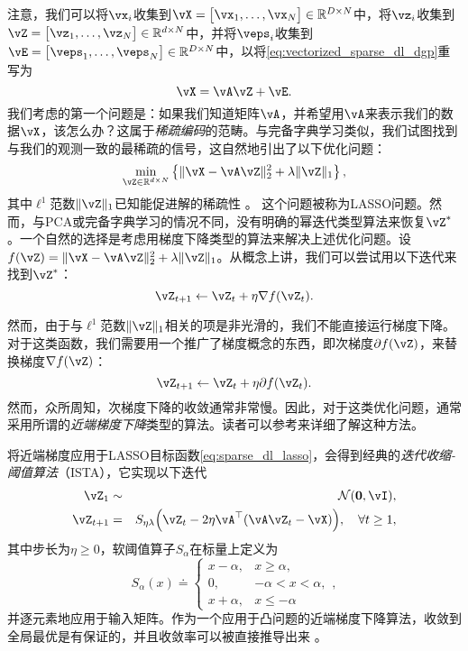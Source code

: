 \documentclass[../../book-main_zh.tex]{subfiles}
\begin{document}
注意，我们可以将\(\vx_{i}\)收集到\(\vX = \mat{\vx_{1}, \dots, \vx_{N}} \in \R^{D \times N}\)中，将\(\vz_{i}\)收集到\(\vZ = \mat{\vz_{1}, \dots, \vz_{N}} \in \R^{d  \times N}\)中，并将\(\veps_{i}\)收集到\(\vE = \mat{\veps_{1}, \dots, \veps_{N}} \in \R^{D \times N}\)中，以将\eqref{eq:vectorized_sparse_dl_dgp}重写为
\begin{equation}\label{eq:sparse_dl_dgp}
    \vX = \vA\vZ + \vE.
\end{equation}
我们考虑的第一个问题是：如果我们知道矩阵\(\vA\)，并希望用\(\vA\)来表示我们的数据\(\vX\)，该怎么办？这属于\textit{稀疏编码}的范畴。与完备字典学习类似，我们试图找到与我们的观测一致的最稀疏的信号，这自然地引出了以下优化问题：
\begin{equation}\label{eq:sparse_dl_lasso}
    \min_{\vZ \in \R^{d \times N}}\bc{\norm{\vX - \vA\vZ}_{2}^{2} + \lambda \norm{\vZ}_{1}},
\end{equation}
其中\(\ell^1\)范数\(\norm{\vZ}_{1}\)已知能促进解的稀疏性 \cite{Wright-Ma-2022}。
这个问题被称为LASSO问题。然而，与PCA或完备字典学习的情况不同，没有明确的幂迭代类型算法来恢复\(\vZ^{\ast}\)。一个自然的选择是考虑用梯度下降类型的算法来解决上述优化问题。设\(f(\vZ) = \norm{\vX - \vA\vZ}_{2}^{2} + \lambda \norm{\vZ}_{1}\)。从概念上讲，我们可以尝试用以下迭代来找到\(\vZ^{\ast}\)：
\begin{equation}
    \vZ_{t+1} \leftarrow \vZ_t + \eta \nabla f(\vZ_t).
\end{equation}

然而，由于与\(\ell^1\)范数\(\norm{\vZ}_{1}\)相关的项是非光滑的，我们不能直接运行梯度下降。对于这类函数，我们需要用一个推广了梯度概念的东西，即次梯度\(\partial f(\vZ)\)，来替换梯度\(\nabla f(\vZ)\)：
\begin{equation}
    \vZ_{t+1} \leftarrow \vZ_t + \eta \partial f(\vZ_t).
\end{equation}
然而，众所周知，次梯度下降的收敛通常非常慢。因此，对于这类优化问题，通常采用所谓的\textit{近端梯度下降}类型的算法。读者可以参考\cite{Wright-Ma-2022}来详细了解这种方法。

将近端梯度应用于LASSO目标函数\eqref{eq:sparse_dl_lasso}，会得到经典的\textit{迭代收缩-阈值算法}（ISTA），它实现以下迭代
\begin{eqnarray}
    \vZ_{1} &\sim& \dNorm(\vzero, \vI), \\
    \vZ_{t + 1} &=& S_{\eta\lambda}\rp{\vZ_{t} - 2\eta \vA^{\top}(\vA\vZ_{t} - \vX)}, \quad \forall t \geq 1,\label{eq:ista_update}
\end{eqnarray}
其中步长为\(\eta \geq 0\)，软阈值算子\(S_{\alpha}\)在标量上定义为
\begin{equation}
    S_{\alpha}(x) \doteq \begin{cases}x - \alpha, & x \geq \alpha, \\ 0, & -\alpha < x < \alpha, \\ x + \alpha, & x \leq -\alpha\end{cases},
\end{equation}
并逐元素地应用于输入矩阵。作为一个应用于凸问题的近端梯度下降算法，收敛到全局最优是有保证的，并且收敛率可以被直接推导出来 \cite{Wright-Ma-2022}。
\end{document}

